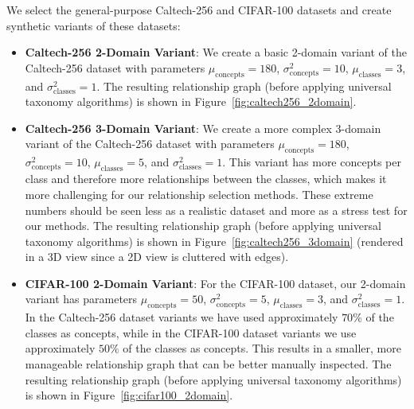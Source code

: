 We select the general-purpose Caltech-256 and CIFAR-100 datasets
and create synthetic variants of these datasets:
\begin{itemize}
      \item \textbf{Caltech-256 2-Domain Variant}:
            We create a basic 2-domain variant of the Caltech-256 dataset
            with parameters $\mu_{\text{concepts}}=180$, $\sigma^2_{\text{concepts}}=10$,
            $\mu_{\text{classes}}=3$, and $\sigma^2_{\text{classes}}=1$.
            The resulting relationship graph (before applying universal taxonomy algorithms)
            is shown in Figure~\ref{fig:caltech256_2domain}.
      \item \textbf{Caltech-256 3-Domain Variant}:
            We create a more complex 3-domain variant of the Caltech-256 dataset
            with parameters $\mu_{\text{concepts}}=180$, $\sigma^2_{\text{concepts}}=10$,
            $\mu_{\text{classes}}=5$, and $\sigma^2_{\text{classes}}=1$.
            This variant has more concepts per class and therefore more relationships
            between the classes, which makes it more challenging for our relationship selection methods.
            These extreme numbers should be seen less as a realistic dataset
            and more as a stress test for our methods.
            The resulting relationship graph (before applying universal taxonomy algorithms)
            is shown in Figure~\ref{fig:caltech256_3domain} (rendered in a 3D view since a 2D view is cluttered with edges).
      \item \textbf{CIFAR-100 2-Domain Variant}:
            For the CIFAR-100 dataset,
            our 2-domain variant has parameters $\mu_{\text{concepts}}=50$, $\sigma^2_{\text{concepts}}=5$,
            $\mu_{\text{classes}}=3$, and $\sigma^2_{\text{classes}}=1$.
            In the Caltech-256 dataset variants we have used approximately $70\%$ of the classes as concepts,
            while in the CIFAR-100 dataset variants we use approximately $50\%$ of the classes as concepts.
            This results in a smaller, more manageable relationship graph
            that can be better manually inspected.
            The resulting relationship graph (before applying universal taxonomy algorithms)
            is shown in Figure~\ref{fig:cifar100_2domain}.
\end{itemize}

